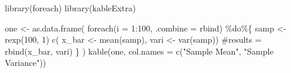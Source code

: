 \documentclass[
  letterpaper,
  DIV=11,
  numbers=noendperiod]{scrreprt}
\newenvironment{Shaded}{\begin{snugshade}}{\end{snugshade}}
\newcommand{\AttributeTok}[1]{\textcolor[rgb]{0.40,0.45,0.13}{#1}}
\newcommand{\CommentTok}[1]{\textcolor[rgb]{0.37,0.37,0.37}{#1}}
\newcommand{\DecValTok}[1]{\textcolor[rgb]{0.68,0.00,0.00}{#1}}
\newcommand{\FunctionTok}[1]{\textcolor[rgb]{0.28,0.35,0.67}{#1}}
\newcommand{\NormalTok}[1]{\textcolor[rgb]{0.00,0.23,0.31}{#1}}
\newcommand{\OtherTok}[1]{\textcolor[rgb]{0.00,0.23,0.31}{#1}}
\newcommand{\SpecialCharTok}[1]{\textcolor[rgb]{0.37,0.37,0.37}{#1}}
\newcommand{\StringTok}[1]{\textcolor[rgb]{0.13,0.47,0.30}{#1}}
\begin{document}
\begin{Shaded}
\begin{Highlighting}[]
\FunctionTok{library}\NormalTok{(foreach)}
\FunctionTok{library}\NormalTok{(kableExtra)}

\NormalTok{one }\OtherTok{\textless{}{-}} \FunctionTok{as.data.frame}\NormalTok{( }\FunctionTok{foreach}\NormalTok{(}\AttributeTok{i =} \DecValTok{1}\SpecialCharTok{:}\DecValTok{100}\NormalTok{, }\AttributeTok{.combine =}\NormalTok{ rbind) }\SpecialCharTok{\%do\%}\NormalTok{\{}
\NormalTok{  samp }\OtherTok{\textless{}{-}} \FunctionTok{rexp}\NormalTok{(}\DecValTok{100}\NormalTok{, }\DecValTok{1}\NormalTok{)}
  \FunctionTok{c}\NormalTok{(}
\NormalTok{  x\_bar }\OtherTok{\textless{}{-}} \FunctionTok{mean}\NormalTok{(samp),}
\NormalTok{  vari }\OtherTok{\textless{}{-}} \FunctionTok{var}\NormalTok{(samp))}
  \CommentTok{\#results = rbind(x\_bar, vari)}
\NormalTok{\}}
\NormalTok{)}
\FunctionTok{kable}\NormalTok{(one,}
      \AttributeTok{col.names =} \FunctionTok{c}\NormalTok{(}\StringTok{"Sample Mean"}\NormalTok{, }\StringTok{"Sample Variance"}\NormalTok{))}
\end{Highlighting}
\end{Shaded}
\end{document}
